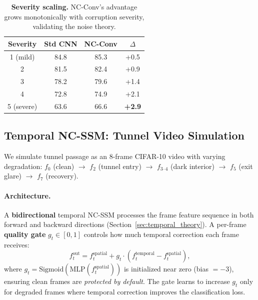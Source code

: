 \documentclass[10pt,twocolumn,letterpaper]{article}
\begin{document}
\begin{table}[t]
\centering
\caption{\textbf{Severity scaling.} NC-Conv's advantage grows monotonically with corruption severity, validating the noise theory.}
\label{tab:severity}
\small
\begin{tabular}{@{}cccc@{}}
\toprule
\textbf{Severity} & \textbf{Std CNN} & \textbf{NC-Conv} & $\Delta$ \\
\midrule
1 (mild)   & 84.8 & 85.3 & +0.5 \\
2          & 81.5 & 82.4 & +0.9 \\
3          & 78.2 & 79.6 & +1.4 \\
4          & 72.8 & 74.9 & +2.1 \\
5 (severe) & 63.6 & 66.6 & \textbf{+2.9} \\
\bottomrule
\end{tabular}
\end{table}


\subsection{Temporal NC-SSM: Tunnel Video Simulation}
\label{sec:temporal_exp}

We simulate tunnel passage as an 8-frame CIFAR-10 video with varying degradation: $f_0$ (clean) $\to$ $f_2$ (tunnel entry) $\to$ $f_{3\text{--}4}$ (dark interior) $\to$ $f_5$ (exit glare) $\to$ $f_7$ (recovery).

\paragraph{Architecture.}
A \textbf{bidirectional} temporal NC-SSM processes the frame feature sequence in both forward and backward directions (Section~\ref{sec:temporal_theory}).
A per-frame \textbf{quality gate} $g_t \in [0,1]$ controls how much temporal correction each frame receives:
\begin{equation}
f_t^{\text{out}} = f_t^{\text{spatial}} + g_t \cdot (f_t^{\text{temporal}} - f_t^{\text{spatial}}),
\label{eq:quality_gate}
\end{equation}
where $g_t = \text{Sigmoid}(\text{MLP}(f_t^{\text{spatial}}))$ is initialized near zero (bias $= -3$), ensuring clean frames are \emph{protected by default}.
The gate learns to increase $g_t$ only for degraded frames where temporal correction improves the classification loss.
\end{document}
